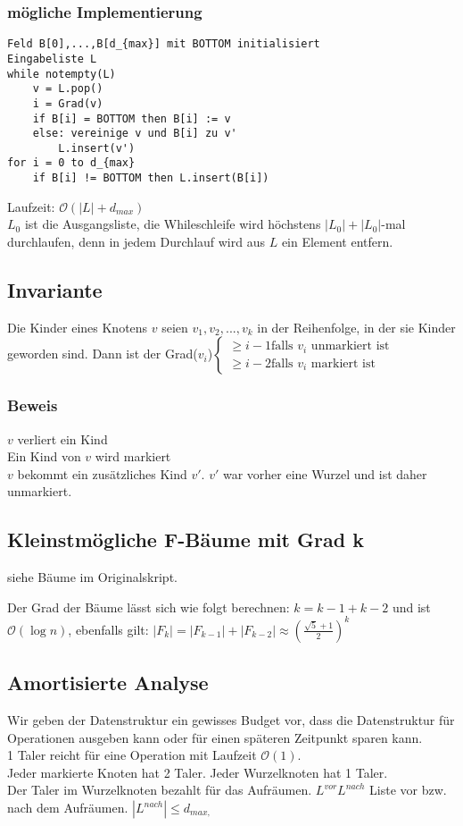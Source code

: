 \subsubsection{mögliche Implementierung}
\begin{lstlisting}[mathescape]
Feld B[0],...,B[d_{max}] mit BOTTOM initialisiert
Eingabeliste L
while notempty(L)
	v = L.pop()
	i = Grad(v)
	if B[i] = BOTTOM then B[i] := v
	else: vereinige v und B[i] zu v'
		L.insert(v')
for i = 0 to d_{max}
	if B[i] != BOTTOM then L.insert(B[i])
\end{lstlisting}
Laufzeit: $\mathcal{O}(|L|+d_{max})$\\
$L_0$ ist die Ausgangsliste, die Whileschleife wird höchstens $|L_0|+|L_0|$-mal durchlaufen, denn in jedem Durchlauf wird aus $L$ ein Element entfern.\\

\subsection{Invariante}
Die Kinder eines Knotens $v$ seien $v_1,v_2,...,v_k$ in der Reihenfolge, in der sie Kinder geworden sind. Dann ist der Grad($v_i$)$\begin{cases} \geq i-1 \text{falls $v_i$ unmarkiert ist} \\ \geq i-2 \text{falls $v_i$ markiert ist} \end{cases}$

\subsubsection{Beweis}
$v$ verliert ein Kind \checkmark\\
Ein Kind von $v$ wird markiert \checkmark\\
$v$ bekommt ein zusätzliches Kind $v'$. $v'$ war vorher eine Wurzel und ist daher unmarkiert. \checkmark\\

\subsection{Kleinstmögliche F-Bäume mit Grad k}
siehe Bäume im Originalskript.

Der Grad der Bäume lässt sich wie folgt berechnen: $k = k-1 + k-2$ und ist $\mathcal{O}(\log n)$, ebenfalls gilt: $|F_k| = |F_{k-1}| + |F_{k-2}| \approx (\frac{\sqrt{5}+1}{2})^k$

\subsection{Amortisierte Analyse}
Wir geben der Datenstruktur ein gewisses Budget vor, dass die Datenstruktur für Operationen ausgeben kann oder für einen späteren Zeitpunkt sparen kann.\\ 1 Taler reicht für eine Operation mit Laufzeit $\mathcal{O}(1)$.\\
Jeder markierte Knoten hat 2 Taler. Jeder Wurzelknoten hat 1 Taler.\\
Der Taler im Wurzelknoten bezahlt für das Aufräumen. $L^{vor} L^{nach}$ Liste vor bzw. nach dem Aufräumen. $|L^{nach}| \leq d_{max‚}$\\
